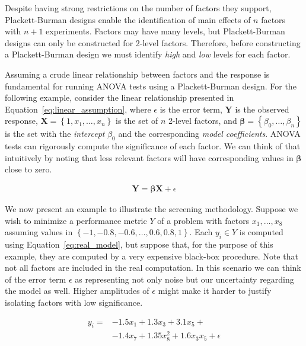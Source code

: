 \documentclass[conference]{IEEEtran}
\begin{document}
Despite having strong restrictions on the number of factors they support,
Plackett-Burman designs enable the identification of main effects of \(n\) factors
with \(n + 1\) experiments. Factors may have many levels, but Plackett-Burman
designs can only be constructed for 2-level factors. Therefore, before
constructing a Plackett-Burman design we must identify \emph{high} and \emph{low} levels
for each factor.

Assuming a crude linear relationship between factors and the response is
fundamental for running ANOVA tests using a Plackett-Burman design. For the
following example, consider the linear relationship presented in
Equation~\eqref{eq:linear_assumption}, where \(\epsilon\) is the error term,
\(\mathbf{Y}\) is the observed response, \(\mathbf{X} = \left\{1,
x_1,\dots,x_n\right\}\) is the set of \(n\) 2-level factors, and \(\bm{\beta} =
\left\{\beta_0,\dots,\beta_n\right\}\) is the set with the \emph{intercept} \(\beta_0\)
and the corresponding \emph{model coefficients}. ANOVA tests can rigorously compute
the significance of each factor. We can think of that intuitively by noting that
less relevant factors will have corresponding values in \(\bm{\beta}\) close to
zero.

{\normalsize
\begin{align}
\mathbf{Y} = \bm{\beta}\mathbf{X} + \epsilon
\label{eq:linear_assumption}
\end{align}
}

We now present an example to illustrate the screening methodology. Suppose we
wish to minimize a performance metric \(Y\) of a problem with factors
\(x_1,\dots,x_8\) assuming values in \(\left\{-1, -0.8, -0.6, \dots, 0.6, 0.8,
1\right\}\). Each \(y_i \in Y\) is computed using
Equation~\eqref{eq:real_model}, but suppose that, for the purpose of this
example, they are computed by a very expensive black-box procedure. Note that
not all factors are included in the real computation. In this scenario we can
think of the error term \(\epsilon\) as representing not only noise but our
uncertainty regarding the model as well. Higher amplitudes of \(\epsilon\) might
make it harder to justify isolating factors with low significance.

{\normalsize
\begin{align}
\label{eq:real_model}
y_i = & -1.5x_1 + 1.3x_3 + 3.1x_5 + \\
& -1.4x_7 + 1.35x_8^2 + 1.6x_3x_5 + \epsilon \nonumber
\end{align}
}
\end{document}
